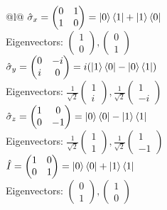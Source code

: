 \documentclass[letterpaper, 8pt]{extarticle}
\begin{document}
\begin{multicols*}{5}
    \begin{tabular}{@{}l@{}} \toprule
        \(\hat{\sigma}_x
        = \begin{pmatrix}
              0 & 1 \\
              1 & 0
          \end{pmatrix}
        = \ket{0}\bra{1}+\ket{1}\bra{0}\)    \\
        \quad Eigenvectors: \(
        \begin{pmatrix}1\\0\end{pmatrix},
        \begin{pmatrix}0\\1\end{pmatrix}
        \)                                   \\
        \(\hat{\sigma}_y
        = \begin{pmatrix}
              0 & -i \\
              i & 0
          \end{pmatrix}
        = i(\ket{1}\bra{0}-\ket{0}\bra{1})\) \\
        \quad Eigenvectors: \(
        \frac{1}{\sqrt{2}}\begin{pmatrix}1\\i\end{pmatrix},
        \frac{1}{\sqrt{2}}\begin{pmatrix}1\\-i\end{pmatrix}
        \)                                   \\
        \(\hat{\sigma}_z
        = \begin{pmatrix}
              1 & 0  \\
              0 & -1
          \end{pmatrix}
        = \ket{0}\bra{0}-\ket{1}\bra{1}\)    \\
        \quad Eigenvectors: \(
        \frac{1}{\sqrt{2}}\begin{pmatrix}1\\1\end{pmatrix},
        \frac{1}{\sqrt{2}}\begin{pmatrix}1\\-1\end{pmatrix}
        \)                                   \\
        \(\hat{I}
        = \begin{pmatrix}
              1 & 0 \\
              0 & 1
          \end{pmatrix}
        = \ket{0}\bra{0}+\ket{1}\bra{1}\)    \\
        \quad Eigenvectors: \(
        \begin{pmatrix}0\\1\end{pmatrix},
        \begin{pmatrix}1\\0\end{pmatrix}
        \)                                   \\
        \bottomrule
    \end{tabular}


\end{multicols*}
\end{document}
